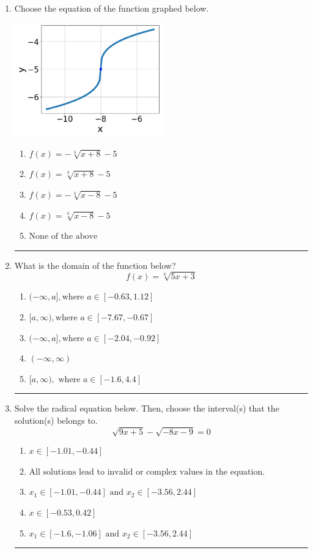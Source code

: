 \documentclass[14pt]{extbook}
\newcommand{\litem}[1]{\item#1\hspace*{-1cm}\rule{\textwidth}{0.4pt}}
\begin{document}
\begin{enumerate}
\litem{
Choose the equation of the function graphed below.
\begin{center}
    \includegraphics[width=0.5\textwidth]{../Figures/radicalGraphToEquationCopyA.png}
\end{center}
\begin{enumerate}[label=\Alph*.]
\item \( f(x) = - \sqrt[3]{x + 8} - 5 \)
\item \( f(x) = \sqrt[3]{x + 8} - 5 \)
\item \( f(x) = - \sqrt[3]{x - 8} - 5 \)
\item \( f(x) = \sqrt[3]{x - 8} - 5 \)
\item \( \text{None of the above} \)

\end{enumerate} }
\litem{
What is the domain of the function below?\[ f(x) = \sqrt[6]{5 x + 3} \]\begin{enumerate}[label=\Alph*.]
\item \( (-\infty, a], \text{where } a \in [-0.63, 1.12] \)
\item \( [a, \infty), \text{where } a \in [-7.67, -0.67] \)
\item \( (-\infty, a], \text{where } a \in [-2.04, -0.92] \)
\item \( (-\infty, \infty) \)
\item \( [a, \infty), \text{ where } a \in [-1.6, 4.4] \)

\end{enumerate} }
\litem{
Solve the radical equation below. Then, choose the interval(s) that the solution(s) belongs to.\[ \sqrt{9 x + 5} - \sqrt{-8 x - 9} = 0 \]\begin{enumerate}[label=\Alph*.]
\item \( x \in [-1.01,-0.44] \)
\item \( \text{All solutions lead to invalid or complex values in the equation.} \)
\item \( x_1 \in [-1.01, -0.44] \text{ and } x_2 \in [-3.56,2.44] \)
\item \( x \in [-0.53,0.42] \)
\item \( x_1 \in [-1.6, -1.06] \text{ and } x_2 \in [-3.56,2.44] \)


\end{enumerate}}
\end{enumerate}
\end{document}
